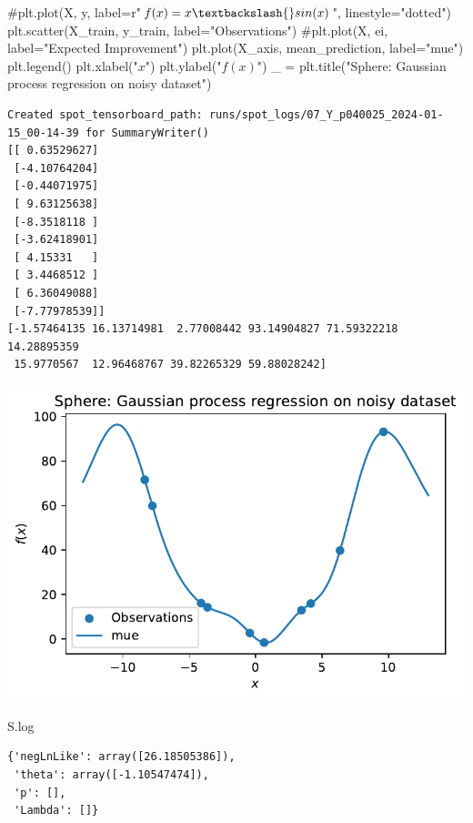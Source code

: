 \documentclass[
  letterpaper,
  DIV=11,
  numbers=noendperiod]{scrreprt}
\newenvironment{Shaded}{\begin{snugshade}}{\end{snugshade}}
\newcommand{\CommentTok}[1]{\textcolor[rgb]{0.37,0.37,0.37}{#1}}
\newcommand{\NormalTok}[1]{\textcolor[rgb]{0.00,0.23,0.31}{#1}}
\newcommand{\OperatorTok}[1]{\textcolor[rgb]{0.37,0.37,0.37}{#1}}
\newcommand{\StringTok}[1]{\textcolor[rgb]{0.13,0.47,0.30}{#1}}
\begin{document}
\begin{Shaded}
\begin{Highlighting}[]
\CommentTok{\#plt.plot(X, y, label=r"$f(x) = x \textbackslash{}sin(x)$", linestyle="dotted")}
\NormalTok{plt.scatter(X\_train, y\_train, label}\OperatorTok{=}\StringTok{"Observations"}\NormalTok{)}
\CommentTok{\#plt.plot(X, ei, label="Expected Improvement")}
\NormalTok{plt.plot(X\_axis, mean\_prediction, label}\OperatorTok{=}\StringTok{"mue"}\NormalTok{)}
\NormalTok{plt.legend()}
\NormalTok{plt.xlabel(}\StringTok{"$x$"}\NormalTok{)}
\NormalTok{plt.ylabel(}\StringTok{"$f(x)$"}\NormalTok{)}
\NormalTok{\_ }\OperatorTok{=}\NormalTok{ plt.title(}\StringTok{"Sphere: Gaussian process regression on noisy dataset"}\NormalTok{)}
\end{Highlighting}
\end{Shaded}

\begin{verbatim}
Created spot_tensorboard_path: runs/spot_logs/07_Y_p040025_2024-01-15_00-14-39 for SummaryWriter()
[[ 0.63529627]
 [-4.10764204]
 [-0.44071975]
 [ 9.63125638]
 [-8.3518118 ]
 [-3.62418901]
 [ 4.15331   ]
 [ 3.4468512 ]
 [ 6.36049088]
 [-7.77978539]]
[-1.57464135 16.13714981  2.77008442 93.14904827 71.59322218 14.28895359
 15.9770567  12.96468767 39.82265329 59.88028242]
\end{verbatim}

\includegraphics{012_num_spot_ei_files/figure-pdf/cell-49-output-2.pdf}

\begin{Shaded}
\begin{Highlighting}[]
\NormalTok{S.log}
\end{Highlighting}
\end{Shaded}

\begin{verbatim}
{'negLnLike': array([26.18505386]),
 'theta': array([-1.10547474]),
 'p': [],
 'Lambda': []}
\end{verbatim}
\end{document}

